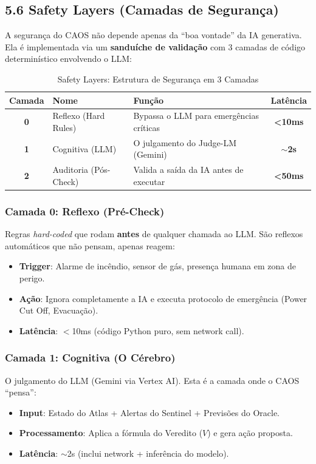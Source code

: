 \documentclass[12pt, a4paper]{article}
\begin{document}
\subsection{5.6 Safety Layers (Camadas de Segurança)}

A segurança do CAOS não depende apenas da ``boa vontade'' da IA generativa. Ela é implementada via um \textbf{sanduíche de validação} com 3 camadas de código determinístico envolvendo o LLM:

\begin{table}[h!]
\centering
\begin{tabular}{|c|l|l|c|}
\hline
\textbf{Camada} & \textbf{Nome} & \textbf{Função} & \textbf{Latência} \\ \hline
\textbf{0} & Reflexo (Hard Rules) & Bypassa o LLM para emergências críticas & \textbf{<10ms} \\ \hline
\textbf{1} & Cognitiva (LLM) & O julgamento do Judge-LM (Gemini) & \textbf{$\sim$2s} \\ \hline
\textbf{2} & Auditoria (Pós-Check) & Valida a saída da IA antes de executar & \textbf{<50ms} \\ \hline
\end{tabular}
\caption{Safety Layers: Estrutura de Segurança em 3 Camadas}
\end{table}

\subsubsection{Camada 0: Reflexo (Pré-Check)}
Regras \textit{hard-coded} que rodam \textbf{antes} de qualquer chamada ao LLM. São reflexos automáticos que não pensam, apenas reagem:
\begin{itemize}
    \item \textbf{Trigger}: Alarme de incêndio, sensor de gás, presença humana em zona de perigo.
    \item \textbf{Ação}: Ignora completamente a IA e executa protocolo de emergência (Power Cut Off, Evacuação).
    \item \textbf{Latência}: $<$10ms (código Python puro, sem network call).
\end{itemize}

\subsubsection{Camada 1: Cognitiva (O Cérebro)}
O julgamento do LLM (Gemini via Vertex AI). Esta é a camada onde o CAOS ``pensa'':
\begin{itemize}
    \item \textbf{Input}: Estado do Atlas + Alertas do Sentinel + Previsões do Oracle.
    \item \textbf{Processamento}: Aplica a fórmula do Veredito ($V$) e gera ação proposta.
    \item \textbf{Latência}: $\sim$2s (inclui network + inferência do modelo).
\end{itemize}
\end{document}
